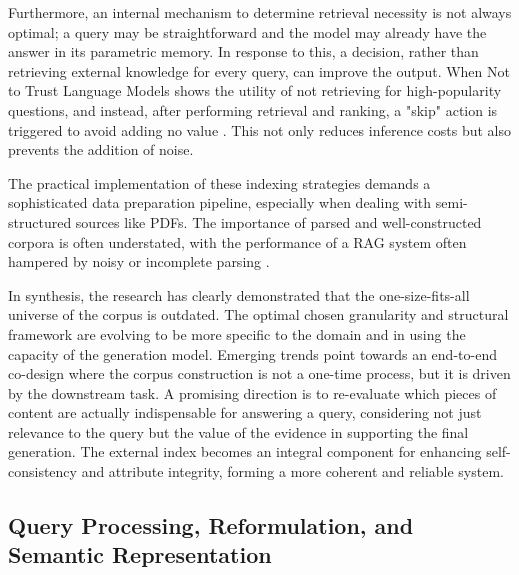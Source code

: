 \documentclass[11pt,a4paper]{article}
\begin{document}
Furthermore, an internal mechanism to determine retrieval necessity is not always optimal; a query may be straightforward and the model may already have the answer in its parametric memory. In response to this, a decision, rather than retrieving external knowledge for every query, can improve the output. When Not to Trust Language Models shows the utility of not retrieving for high-popularity questions, and instead, after performing retrieval and ranking, a "skip" action is triggered to avoid adding no value \cite{arxiv:2212.10511v4}. This not only reduces inference costs but also prevents the addition of noise.

The practical implementation of these indexing strategies demands a sophisticated data preparation pipeline, especially when dealing with semi-structured sources like PDFs. The importance of parsed and well-constructed corpora is often understated, with the performance of a RAG system often hampered by noisy or incomplete parsing \cite{arxiv:2401.12599v1}.

In synthesis, the research has clearly demonstrated that the one-size-fits-all universe of the corpus is outdated. The optimal chosen granularity and structural framework are evolving to be more specific to the domain and in using the capacity of the generation model. Emerging trends point towards an end-to-end co-design where the corpus construction is not a one-time process, but it is driven by the downstream task. A promising direction is to re-evaluate which pieces of content are actually indispensable for answering a query, considering not just relevance to the query but the value of the evidence in supporting the final generation. The external index becomes an integral component for enhancing self-consistency and attribute integrity, forming a more coherent and reliable system.


\subsection{Query Processing, Reformulation, and Semantic Representation}
\end{document}
